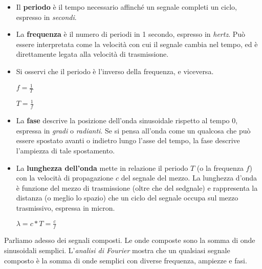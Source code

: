         \begin{itemize}
        
        \item 
            Il \textbf{periodo} è il tempo necessario affinché un segnale completi un ciclo, espresso in \textit{secondi}.
        
        \item
            La \textbf{frequenza} è il numero di periodi in 1 secondo, espresso in \textit{hertz}. Può essere interpretata come la velocità con cui il segnale cambia nel tempo, ed è direttamente legata alla velocità di trasmissione.
        
        \item
            Si osservi che il periodo è l'inverso della frequenza, e viceversa.
        
            \begin{center}
                \(f=\frac{1}{T}\)
                
                \(T=\frac{1}{f}\)
            \end{center}
        
        \item
            La \textbf{fase} descrive la posizione dell'onda sinusoidale rispetto al tempo 0, espressa in \textit{gradi} o \textit{radianti}. Se si pensa all'onda come un qualcosa che può essere spostato avanti o indietro lungo l'asse del tempo, la fase descrive l'ampiezza di tale spostamento.
        
        \item
            La \textbf{lunghezza dell'onda} mette in relazione il periodo \(T\) (o la frequenza \(f\)) con la velocità di propagazione \(c\) del segnale del mezzo. La lunghezza d'onda è funzione del mezzo di trasmissione (oltre che del sedgnale) e rappresenta la distanza (o meglio lo spazio) che un ciclo del segnale occupa sul mezzo trasmissivo, espressa in micron.
        
            \begin{center}
                \(\lambda=c*T=\frac{c}{f}\)
            \end{center}
        \end{itemize}
    
        Parliamo adesso dei segnali composti. Le onde composte sono la somma di onde sinusoidali semplici. L'\textit{analisi di Fourier} mostra che un qualsiasi segnale composto è la somma di onde semplici con diverse frequenza, ampiezze e fasi.
        
